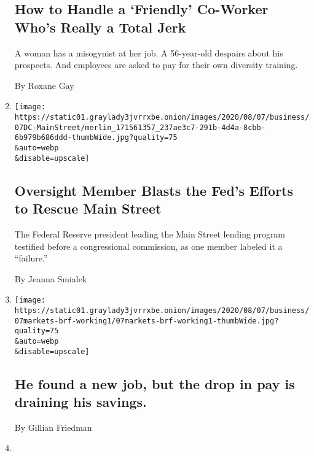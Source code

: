 \begin{enumerate}
  \hypertarget{how-to-handle-a-friendly-co-worker-whos-really-a-total-jerk}{%
  \subsection{How to Handle a `Friendly' Co-Worker Who's Really a Total
  Jerk}\label{how-to-handle-a-friendly-co-worker-whos-really-a-total-jerk}}

  A woman has a misogynist at her job. A 56-year-old despairs about his
  prospects. And employees are asked to pay for their own diversity
  training.

  By Roxane Gay
\item
  \href{/2020/08/07/business/economy/federal-reserve-main-street-lending.html}{}

  \texttt{[image: https://static01.graylady3jvrrxbe.onion/images/2020/08/07/business/07DC-MainStreet/merlin\_171561357\_237ae3c7-291b-4d4a-8cbb-6b979b686ddd-thumbWide.jpg?quality=75\\\&auto=webp\\\&disable=upscale]}

  \hypertarget{oversight-member-blasts-the-feds-efforts-to-rescue-main-street}{%
  \subsection{Oversight Member Blasts the Fed's Efforts to Rescue Main
  Street}\label{oversight-member-blasts-the-feds-efforts-to-rescue-main-street}}

  The Federal Reserve president leading the Main Street lending program
  testified before a congressional commission, as one member labeled it
  a ``failure.''

  By Jeanna Smialek
\item
  \href{/2020/08/07/business/he-found-a-new-job-but-the-drop-in-pay-is-draining-his-savings.html}{}

  \texttt{[image: https://static01.graylady3jvrrxbe.onion/images/2020/08/07/business/07markets-brf-working1/07markets-brf-working1-thumbWide.jpg?quality=75\\\&auto=webp\\\&disable=upscale]}

  \hypertarget{he-found-a-new-job-but-the-drop-in-pay-is-draining-his-savings}{%
  \subsection{He found a new job, but the drop in pay is draining his
  savings.}\label{he-found-a-new-job-but-the-drop-in-pay-is-draining-his-savings}}

  By Gillian Friedman
\item
  \href{/2020/08/07/business/as-a-temporary-closing-turns-permanent-an-owner-and-a-worker-try-to-carry-on.html}{}


\end{enumerate}
